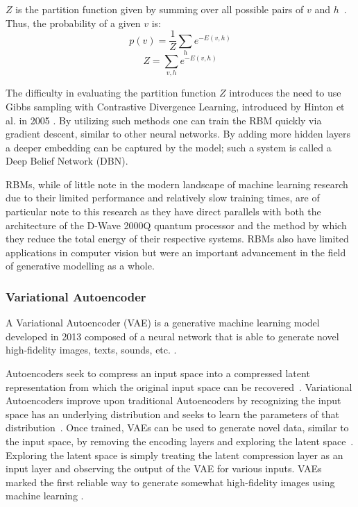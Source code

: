 \documentclass[technologies,article,accept,pdftex,moreauthors]{Definitions/mdpi}
\begin{document}
$Z$ is the partition function given by summing over all possible pairs of $v$ and $h$~\cite{Hinton2012}. Thus, the probability of a given $v$ is: 
\begin{equation}
p(v) = \frac{1}{Z}\sum_{h} e^{-E(v,h)}
\end{equation} 
\begin{equation}
Z = \sum_{v,h}e^{-E(v,h)}
\end{equation}



The difficulty in evaluating the partition function $Z$ introduces the need to use Gibbs sampling with Contrastive Divergence Learning, introduced by Hinton et al. in 2005 \cite{CarreiraPerpin2005OnCD}. By utilizing such methods one can train the RBM quickly via gradient descent, similar to other neural networks. By adding more hidden layers a deeper embedding can be captured by the model; such a system is called a Deep Belief Network (DBN).


RBMs, while of little note in the modern landscape of machine learning research due to their limited performance and relatively slow training times, are of particular note to this research as they have direct parallels with both the architecture of the D-Wave 2000Q quantum processor and the method by which they reduce the total energy of their respective systems. RBMs also have limited applications in computer vision but were an important advancement in the field of generative modelling as a whole.



\subsubsection{Variational Autoencoder}
A Variational Autoencoder (VAE) is a generative machine learning model developed in 2013 composed of a neural network that is able to generate novel high-fidelity images, texts, sounds, etc. \cite{kingma2014autoencoding}.


Autoencoders seek to compress an input space into a compressed latent representation from which the original input space can be recovered~\cite{kingma2014autoencoding}. Variational Autoencoders improve upon traditional Autoencoders by recognizing the input space has an underlying distribution and seeks to learn the parameters of that distribution~\cite{kingma2014autoencoding}. Once trained, VAEs can be used to generate novel data, similar to the input space, by removing the encoding layers and exploring the latent space~\cite{kingma2014autoencoding}. Exploring the latent space is simply treating the latent compression layer as an input layer and observing the output of the VAE for various inputs. VAEs marked the first reliable way to generate somewhat high-fidelity images using machine learning \cite{rocca_2021}.
\end{document}
